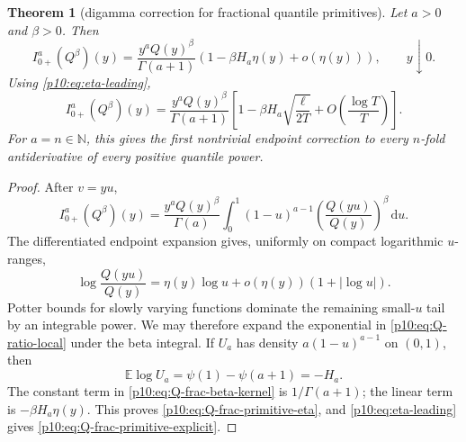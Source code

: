 \documentclass[11pt,oneside]{article}
\newtheorem{theorem}{Theorem}[section]
\theoremstyle{definition}
\theoremstyle{remark}
\newcommand{\Q}{Q}
\newcommand{\E}{\mathbb E}
\newcommand{\N}{\mathbb N}
\newcommand{\dd}{\,\mathrm d}
\newcommand{\1}{\mathbf 1}
\begin{document}
\begin{theorem}[digamma correction for fractional quantile primitives]
\label{p10:thm:Q-fractional-primitive-asymptotic}
Let \(a>0\) and \(\beta>0\).  Then
\begin{equation}\label{p10:eq:Q-frac-primitive-eta}
 I_{0+}^{a}(\Q^\beta)(y)
 =\frac{y^a\Q(y)^\beta}{\Gamma(a+1)}
  \left(1-\beta H_a\eta(y)+o(\eta(y))\right),
 \qquad y\downarrow0.
\end{equation}
Using \eqref{p10:eq:eta-leading},
\begin{equation}\label{p10:eq:Q-frac-primitive-explicit}
 I_{0+}^{a}(\Q^\beta)(y)
 =\frac{y^a\Q(y)^\beta}{\Gamma(a+1)}
 \left[
  1-\beta H_a\sqrt{\frac{\ell}{2T}}
  +O\!\left(\frac{\log T}{T}\right)
 \right].
\end{equation}
For \(a=n\in\N\), this gives the first nontrivial endpoint correction to every
\(n\)-fold antiderivative of every positive quantile power.
\end{theorem}

\begin{proof}
After \(v=yu\),
\begin{equation}\label{p10:eq:Q-frac-beta-kernel}
 I_{0+}^{a}(\Q^\beta)(y)
 =\frac{y^a\Q(y)^\beta}{\Gamma(a)}
  \int_0^1(1-u)^{a-1}
       \left(\frac{\Q(yu)}{\Q(y)}\right)^\beta\dd u.
\end{equation}
The differentiated endpoint expansion gives, uniformly on compact logarithmic
\(u\)-ranges,
\begin{equation}\label{p10:eq:Q-ratio-local}
 \log\frac{\Q(yu)}{\Q(y)}
 =\eta(y)\log u+o(\eta(y))(1+|\log u|).
\end{equation}
Potter bounds for slowly varying functions dominate the remaining small-\(u\) tail by
an integrable power.  We may therefore expand the exponential in
\eqref{p10:eq:Q-ratio-local} under the beta integral.  If \(U_a\) has density
\(a(1-u)^{a-1}\) on \((0,1)\), then
\begin{equation}\label{p10:eq:beta-log-moment}
 \E\log U_a=\psi(1)-\psi(a+1)=-H_a.
\end{equation}
The constant term in \eqref{p10:eq:Q-frac-beta-kernel} is
\(1/\Gamma(a+1)\); the linear term is \(-\beta H_a\eta(y)\).  This proves
\eqref{p10:eq:Q-frac-primitive-eta}, and \eqref{p10:eq:eta-leading} gives
\eqref{p10:eq:Q-frac-primitive-explicit}.
\end{proof}
\end{document}
